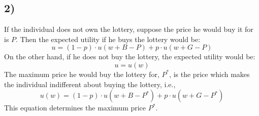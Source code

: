 \documentclass{article}
\begin{document}
\subsection*{2)}
If the individual does not own the lottery, suppose the price he would buy it for is $P$. Then the expected utility if he buys the lottery would be:
	\begin{equation}
		u=(1-p)\cdot u(w+B-P)+p\cdot u(w+G-P)
	\end{equation}
	On the other hand, if he does not buy the lottery, the expected utility would be:
	\begin{equation}
		u = u (w)
	\end{equation}
	The maximum price he would buy the lottery for, $P^{*}$, is the price which makes the individual indifferent about buying the lottery, i.e.,
	\begin{equation}
		\label{eq_2_2_main}
		u(w)=(1-p)\cdot u\left(w+B-P^*\right)+p\cdot u\left(w+G-P^*\right)
	\end{equation}
	This equation determines the maximum price $P^{*}$.
\end{document}
